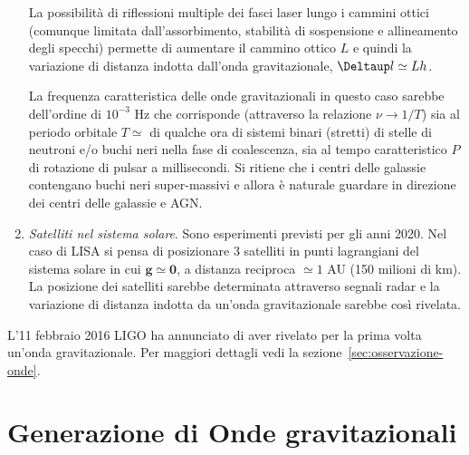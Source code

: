 \begin{enumerate}
  La possibilità di riflessioni multiple dei fasci laser lungo i cammini ottici
  (comunque limitata dall'assorbimento, stabilità di sospensione e allineamento
  degli specchi) permette di aumentare il cammino ottico $L$ e quindi la
  variazione di distanza indotta dall'onda gravitazionale, $\var l \simeq L h$.

  La frequenza caratteristica delle onde gravitazionali in questo caso sarebbe
  dell'ordine di $10^{-3}$ Hz che corrisponde (attraverso la relazione $\nu \to
  1/T$) sia al periodo orbitale $T \simeq $ di qualche ora di sistemi binari
  (stretti) di stelle di neutroni e/o buchi neri nella fase di coalescenza, sia
  al tempo caratteristico $P$ di rotazione di pulsar a millisecondi. Si ritiene
  che i centri delle galassie contengano buchi neri super-massivi e allora è
  naturale guardare in direzione dei centri delle galassie e AGN.

\item \emph{Satelliti nel sistema solare}.  Sono esperimenti previsti per gli
  anni 2020.  Nel caso di LISA si pensa di posizionare 3 satelliti in punti
  lagrangiani del sistema solare in cui $\bm{g} \simeq \bm{0}$, a distanza
  reciproca $\simeq 1$ AU (150 milioni di km).  La posizione dei satelliti
  sarebbe determinata attraverso segnali radar e la variazione di distanza
  indotta da un'onda gravitazionale sarebbe così rivelata.
\end{enumerate}

L'11 febbraio 2016 LIGO ha annunciato di aver rivelato per la prima volta
un'onda gravitazionale.  Per maggiori dettagli vedi la
sezione~\ref{sec:osservazione-onde}.

\section{Generazione di Onde gravitazionali}
\label{sec:onde-grav-masse}

